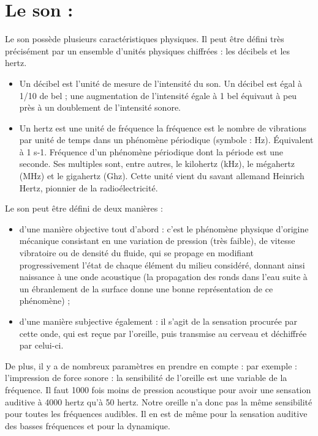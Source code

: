 \documentclass[12pt,french]{report}
\makeatletter
\let\SF@@footnote\footnote
\def\footnote{\ifx\protect\@typeset@protect
    \expandafter\SF@@footnote
  \else
    \expandafter\SF@gobble@opt
  \fi
}
\edef\SF@gobble@opt{\noexpand\protect
  \expandafter\noexpand\csname SF@gobble@opt \endcsname}
\makeatother
\begin{document}
\section{Le son :}

Le son possède plusieurs caractéristiques physiques. Il peut être
défini très précisément par un ensemble d'unités physiques chiffrées
: les décibels et les hertz. 
\begin{itemize}
\item Un décibel est l'unité de mesure de l'intensité du son. Un décibel
est égal à 1/10 de bel ; une augmentation de l'intensité égale à 1
bel équivaut à peu près à un doublement de l'intensité sonore. 
\item Un hertz est une unité de fréquence\footnote{la fréquence est le nombre de vibrations par unité de temps dans un
phénomène périodique} (symbole : Hz). Équivalent à 1 s-1. Fréquence d'un phénomène périodique
dont la période est une seconde. Ses multiples sont, entre autres,
le kilohertz (kHz), le mégahertz (MHz) et le gigahertz (Ghz). Cette
unité vient du savant allemand Heinrich Hertz, pionnier de la radioélectricité.
\end{itemize}
Le son peut être défini de deux manières : 
\begin{itemize}
\item d'une manière objective tout d'abord : c'est le phénomène physique
d'origine mécanique consistant en une variation de pression (très
faible), de vitesse vibratoire ou de densité du fluide, qui se propage
en modifiant progressivement l'état de chaque élément du milieu considéré,
donnant ainsi naissance à une onde acoustique (la propagation des
ronds dans l'eau suite à un ébranlement de la surface donne une bonne
représentation de ce phénomène) ; 
\item d'une manière subjective également : il s'agit de la sensation procurée
par cette onde, qui est reçue par l'oreille, puis transmise au cerveau
et déchiffrée par celui-ci.
\end{itemize}
De plus, il y a de nombreux paramètres en prendre en compte : par
exemple : l'impression de force sonore : la sensibilité de l'oreille
est une variable de la fréquence. Il faut 1000 fois moins de pression
acoustique pour avoir une sensation auditive à 4000 hertz qu'à 50
hertz. Notre oreille n'a donc pas la même sensibilité pour toutes
les fréquences audibles. Il en est de même pour la sensation auditive
des basses fréquences et pour la dynamique. 
\end{document}
